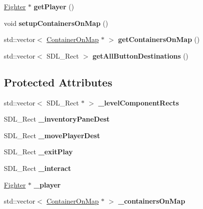 \begin{DoxyCompactItemize}
\hyperlink{class_fighter}{Fighter} $\ast$ {\bfseries get\+Player} ()
\item 
\hypertarget{class_pre_built_level_ae49e0ab74872be75e2546610607d5868}{}\label{class_pre_built_level_ae49e0ab74872be75e2546610607d5868} 
void {\bfseries setup\+Containers\+On\+Map} ()
\item 
\hypertarget{class_pre_built_level_a0089fb9d42b5ee32e395b7b7c4fd3576}{}\label{class_pre_built_level_a0089fb9d42b5ee32e395b7b7c4fd3576} 
std\+::vector$<$ \hyperlink{struct_container_on_map}{Container\+On\+Map} $\ast$ $>$ {\bfseries get\+Containers\+On\+Map} ()
\item 
\hypertarget{class_pre_built_level_ac03a041e9981a044dceb7aa0b2fa5639}{}\label{class_pre_built_level_ac03a041e9981a044dceb7aa0b2fa5639} 
std\+::vector$<$ S\+D\+L\+\_\+\+Rect $>$ {\bfseries get\+All\+Button\+Destinations} ()
\end{DoxyCompactItemize}
\subsection*{Protected Attributes}
\begin{DoxyCompactItemize}
\item 
\hypertarget{class_pre_built_level_a0ad1ddb709d1134c31749bdedda1ec4a}{}\label{class_pre_built_level_a0ad1ddb709d1134c31749bdedda1ec4a} 
std\+::vector$<$ S\+D\+L\+\_\+\+Rect $\ast$ $>$ {\bfseries \+\_\+level\+Component\+Rects}
\item 
\hypertarget{class_pre_built_level_ad20d575f1727d070b27b3baf7a0c4706}{}\label{class_pre_built_level_ad20d575f1727d070b27b3baf7a0c4706} 
S\+D\+L\+\_\+\+Rect {\bfseries \+\_\+inventory\+Pane\+Dest}
\item 
\hypertarget{class_pre_built_level_a812edb421a0f77672e772a7a6e4e0a09}{}\label{class_pre_built_level_a812edb421a0f77672e772a7a6e4e0a09} 
S\+D\+L\+\_\+\+Rect {\bfseries \+\_\+move\+Player\+Dest}
\item 
\hypertarget{class_pre_built_level_a0cbf9d08b7fcba3c500092b71baabdbb}{}\label{class_pre_built_level_a0cbf9d08b7fcba3c500092b71baabdbb} 
S\+D\+L\+\_\+\+Rect {\bfseries \+\_\+exit\+Play}
\item 
\hypertarget{class_pre_built_level_a58bfd4f0b1261029643f832486046ee0}{}\label{class_pre_built_level_a58bfd4f0b1261029643f832486046ee0} 
S\+D\+L\+\_\+\+Rect {\bfseries \+\_\+interact}
\item 
\hypertarget{class_pre_built_level_a2b17bc23df363f269fedf0aceafc9a02}{}\label{class_pre_built_level_a2b17bc23df363f269fedf0aceafc9a02} 
\hyperlink{class_fighter}{Fighter} $\ast$ {\bfseries \+\_\+player}
\item 
\hypertarget{class_pre_built_level_a757b4089f043d4cef9c24a19b24811fe}{}\label{class_pre_built_level_a757b4089f043d4cef9c24a19b24811fe} 
std\+::vector$<$ \hyperlink{struct_container_on_map}{Container\+On\+Map} $\ast$ $>$ {\bfseries \+\_\+containers\+On\+Map}
\end{DoxyCompactItemize}
